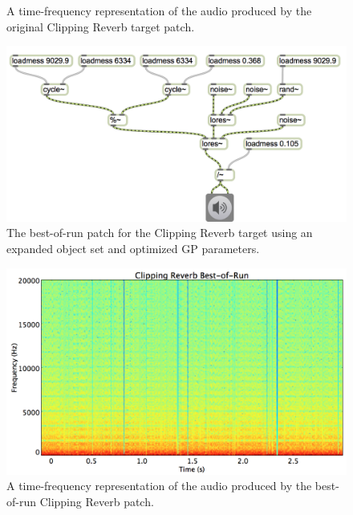 \documentclass[12pt]{report} 	%
\numberwithin{figure}{chapter}
\numberwithin{table}{chapter}
\numberwithin{equation}{chapter}
\begin{document}
\begin{flushleft}
\begin{figure}[h!]
\begin{center}
\caption[Original clipping reverb sawtooth time-frequency representation]{A time-frequency representation of the audio produced by the original Clipping Reverb target patch.}
\end{center}
\vspace{12pt}
\end{figure}
\begin{figure}[h!]
\begin{center}
\includegraphics[width=\linewidth]{ClippingReverb_Best}
\caption[Clipping reverb best-of-run patch]{The best-of-run patch for the Clipping Reverb target using an expanded object set and optimized GP parameters.}
\end{center}
\end{figure}
\begin{figure}[h!]
\begin{center}
\includegraphics[scale=0.33]{ClippingReverbBestOfRunSTFT}
\caption[Best-of-run clipping reverb time-frequency representation]{A time-frequency representation of the audio produced by the best-of-run Clipping Reverb patch.}
\end{center}
\end{figure}


\end{flushleft}
\end{document}
